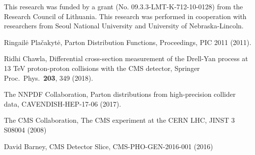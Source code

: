 \documentclass[a0,portrait]{a0poster}
\begin{document}
\begin{multicols}{2}
\begin{centering}
\begin{minipage}[t]{0.48\linewidth}
		\vspace{-0.7cm}
	\end{minipage}
\end{centering}
\vspace{0.5cm}

\noindent This research was funded by a grant (No. 09.3.3-LMT-K-712-10-0128) from the Research Council of Lithuania.
This research was performed in cooperation with researchers from Seoul National University and University of Nebraska-Lincoln.

\begin{thebibliography}{References}
	\vspace{-0.5cm}
	 Ringail\.{e} Pla\v{c}akyt\.{e}, Parton Distribution Functions, Proceedings, PIC 2011 (2011).
	
	 Ridhi Chawla, Differential cross-section measurement of the Drell-Yan process at 13 TeV proton-proton
	collisions with the CMS detector, Springer Proc.\ Phys.\  \textbf{203}, 349 (2018).	
	
	 The NNPDF Collaboration, Parton distributions from high-precision collider data, CAVENDISH-HEP-17-06 (2017).


	 The CMS Collaboration, The CMS experiment at the CERN LHC, JINST 3 S08004 (2008)

	 David Barney, CMS Detector Slice, CMS-PHO-GEN-2016-001 (2016)

\end{thebibliography}

\end{multicols}
\end{document}
